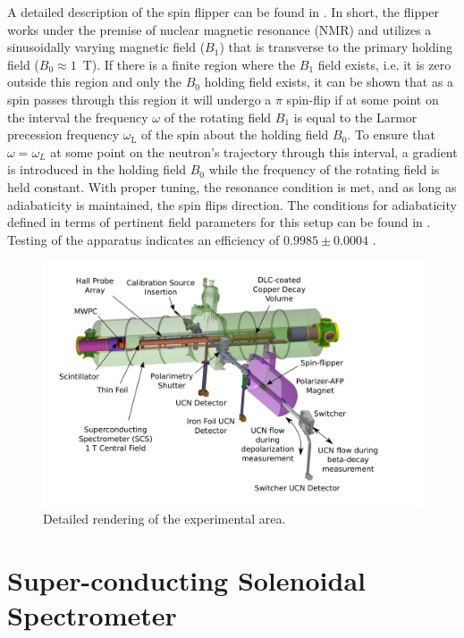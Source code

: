A detailed description of the spin flipper can be found in \cite{holley2012high}. In short, the
flipper works under the premise of nuclear magnetic resonance (NMR) and utilizes a sinusoidally
varying magnetic field ($B_1$) that is transverse to the primary holding field ($B_0\approx 1$~T).
If there is a finite region where the $B_1$ field exists, i.e. it is zero outside this region and only
the $B_0$ holding field exists, it can be shown that as a spin passes through this region
it will undergo a $\pi$ spin-flip if at some point on the interval
the frequency $\omega$ of the rotating field $B_1$ is equal to the
Larmor precession frequency $\omega_{\mathrm{L}}$ of the spin about the holding field $B_0$.
To ensure that $\omega = \omega_L$ at some point
on the neutron's trajectory through this interval,
a gradient is introduced in the holding field $B_0$ while the frequency of
the rotating field is held constant. With proper tuning, the resonance condition is met, and as long
as adiabaticity is maintained, the spin flips direction. The conditions for adiabaticity defined in terms
of pertinent field parameters for this setup can be found in
\cite{holley2012high}. Testing of the apparatus indicates an efficiency of $0.9985\pm0.0004$ \cite{holley2012high}.

\begin{figure}[h]
  \centering
  \includegraphics[scale=0.38]{2-UCNAExperiment/UCNAFig.pdf} 
  \caption{Detailed rendering of the experimental area. }
  \label{fig:setup}
\end{figure}

\section{Super-conducting Solenoidal Spectrometer}

